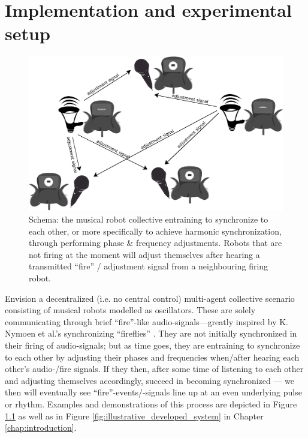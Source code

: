 \chapter{Implementation and experimental setup}
\label{chap:implementation}

\begin{figure}[h]
	\centering
	\includegraphics[width=0.9\linewidth]{Assets/DocSegments/Chapters/Implementation/Figures/Illustrations/schematic_initial_idea.pdf}
	\caption[Schema of the developed musical multi robot collective.]{Schema: the musical robot collective entraining to synchronize to each other, or more specifically to achieve harmonic synchronization, through performing phase \& frequency adjustments. Robots that are not firing at the moment will adjust themselves after hearing a transmitted ``fire'' / adjustment signal from a neighbouring firing robot.}
	\label{fig:first_idea:first_fig}
\end{figure}

Envision a decentralized (i.e. no central control) multi-agent collective scenario consisting of musical robots modelled as oscillators. These are solely communicating through brief ``fire''-like audio-signals—greatly inspired by K. Nymoen et al.'s synchronizing ``fireflies'' \cite{nymoen_synch}. They are not initially synchronized in their firing of audio-signals; but as time goes, they are entraining to synchronize to each other by adjusting their phases and frequencies when/after hearing each other's audio-/fire signals. If they then, after some time of listening to each other and adjusting themselves accordingly, succeed in becoming synchronized — we then will eventually see ``fire''-events/-signals line up at an even underlying pulse or rhythm. Examples and demonstrations of this process are depicted in Figure \ref{fig:first_idea:first_fig} as well as in Figure \ref{fig:illustrative_developed_system} in Chapter \ref{chap:introduction}.

